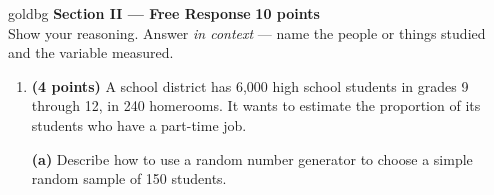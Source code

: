 \documentclass[12pt]{article}
\begin{document}
\vspace{0.14in}

\boxguard[30]
\begin{headlinebox}{goldbg}
\small
\textbf{Section II --- Free Response} \hfill \textbf{10 points}\\
Show your reasoning. Answer \emph{in context} --- name the people or things studied and the
variable measured.
\end{headlinebox}

\vspace{0.10in}

\begin{enumerate}[leftmargin=1.9em, itemsep=0.16in, resume]

  \boxguard[26]
  \item \textbf{(4 points)} A school district has 6{,}000 high school students in grades 9
        through 12, in 240 homerooms. It wants to estimate the proportion of its students who
        have a part-time job.

        \vspace{6pt}
        \textbf{(a)} Describe how to use a random number generator to choose a simple random
        sample of 150 students.\\[4pt]
        \\
        \\
        \\
        \ansline{}\\
        \ansline{}\\
        \ansline{}\\
        \ansline{}\\
        \ansline{}


\end{enumerate}
\end{document}
